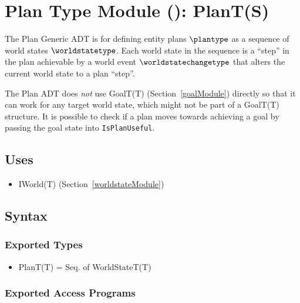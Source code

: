 \section{Plan Type Module (): PlanT(S)} \label{planModule}

The Plan Generic ADT is for defining entity plans $\plantype$ as a sequence of
world states $\worldstatetype$. Each world state in the sequence is a ``step''
in the plan achievable by a world event $\worldstatechangetype$ that alters the
current world state to a plan ``step''.

The Plan ADT does \textit{not} use GoalT(T) (Section~\ref{goalModule}) directly
so that it can work for any target world state, which might not be part of a
GoalT(T) structure. It is possible to check if a plan moves towards achieving a
goal by passing the goal state into \texttt{IsPlanUseful}.

\subsection{Uses}
\begin{itemize}[noitemsep, nosep]

    \item IWorld(T) (Section~\ref{worldstateModule})

\end{itemize}

\subsection{Syntax}

\subsubsection{Exported Types}
\begin{itemize}

    \item PlanT(T) = Seq. of WorldStateT(T)

\end{itemize}

\subsubsection{Exported Access Programs}


